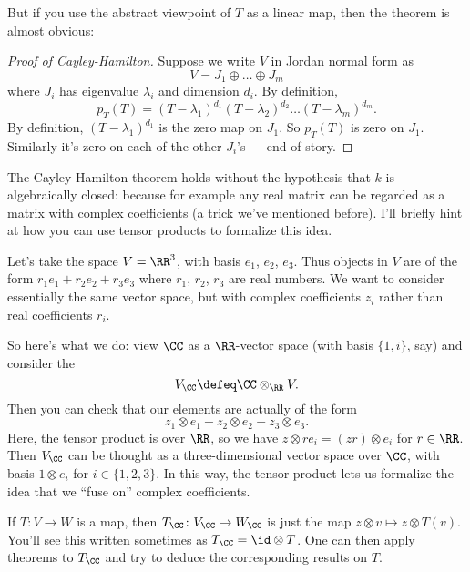 But if you use the abstract viewpoint of $T$ as a linear map,
then the theorem is almost obvious:
\begin{proof}[Proof of Cayley-Hamilton]
	Suppose we write $V$ in Jordan normal form as
	\[ V = J_1 \oplus \dots \oplus J_m \]
	where $J_i$ has eigenvalue $\lambda_i$ and dimension $d_i$.
	By definition,
	\[ p_T(T) = (T - \lambda_1)^{d_1} (T - \lambda_2)^{d_2}
		\dots (T - \lambda_m)^{d_m}. \]
	By definition, $(T - \lambda_1)^{d_1}$ is the zero map on $J_1$.
	So $p_T(T)$ is zero on $J_1$.
	Similarly it's zero on each of the other $J_i$'s --- end of story.
\end{proof}
\begin{remark}
	[Tensoring up]
	The Cayley-Hamilton theorem holds without the hypothesis that
	$k$ is algebraically closed:
	because for example any real matrix can be regarded
	as a matrix with complex coefficients
	(a trick we've mentioned before).
	I'll briefly hint at how you can use tensor products to formalize this idea.

	Let's take the space $V = \RR^3$, with basis $e_1$, $e_2$, $e_3$.
	Thus objects in $V$ are of the form $r_1 e_1 + r_2 e_2 + r_3 e_3$
	where $r_1$, $r_2$, $r_3$ are real numbers.
	We want to consider essentially the same vector space,
	but with complex coefficients $z_i$ rather than real coefficients $r_i$.

	So here's what we do: view $\CC$ as a $\RR$-vector space
	(with basis $\{1,i\}$, say)
	and consider the 
	\[ V_\CC \defeq \CC \otimes_\RR V. \]
	Then you can check that our elements are actually of the form
	\[ z_1 \otimes e_1 + z_2 \otimes e_2 + z_3 \otimes e_3. \]
	Here, the tensor product is over $\RR$,
	so we have $z \otimes re_i = (zr) \otimes e_i$ for $r \in \RR$.
	Then $V_{\CC}$ can be thought as a three-dimensional vector space over $\CC$,
	with basis $1 \otimes e_i$ for $i \in \{1,2,3\}$.
	In this way, the tensor product lets us formalize the idea
	that we ``fuse on'' complex coefficients.

	If $T \colon V \to W$ is a map, then $T_\CC \colon V_\CC \to W_\CC$
	is just the map $z \otimes v \mapsto z \otimes T(v)$.
	You'll see this written sometimes as $T_\CC = \id \otimes T$.
	One can then apply theorems to $T_\CC$
	and try to deduce the corresponding results on $T$.
\end{remark}

